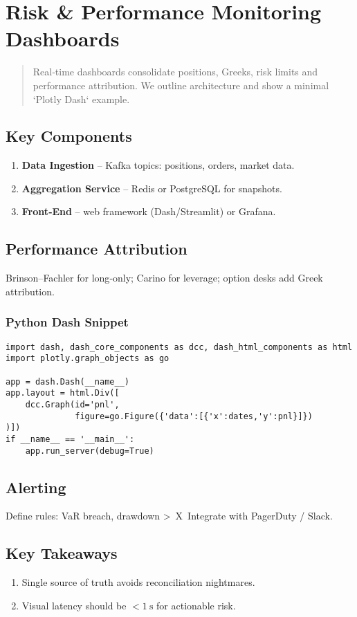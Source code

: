 \chapter{Risk \& Performance Monitoring Dashboards}\label{ch:dashboards}

\begin{abstract}
Real‑time dashboards consolidate positions, Greeks, risk limits and
performance attribution.  We outline architecture and show a minimal
`Plotly Dash` example.
\end{abstract}

\section{Key Components}

\begin{enumerate}
  \item \textbf{Data Ingestion} – Kafka topics: positions, orders, market data.
  \item \textbf{Aggregation Service} – Redis or PostgreSQL for snapshots.
  \item \textbf{Front‑End} – web framework (Dash/Streamlit) or Grafana.
\end{enumerate}

\section{Performance Attribution}

Brinson–Fachler for long‑only; Carino for leverage; option desks add
Greek attribution.

\subsection*{Python Dash Snippet}

\begin{verbatim}
import dash, dash_core_components as dcc, dash_html_components as html
import plotly.graph_objects as go

app = dash.Dash(__name__)
app.layout = html.Div([
    dcc.Graph(id='pnl',
              figure=go.Figure({'data':[{'x':dates,'y':pnl}]})
)])
if __name__ == '__main__':
    app.run_server(debug=True)
\end{verbatim}

\section{Alerting}

Define rules: VaR breach, drawdown > X %
Integrate with PagerDuty / Slack.

\section*{Key Takeaways}
\begin{enumerate}
  \item Single source of truth avoids reconciliation nightmares.
  \item Visual latency should be \(<\SI{1}{\second}\) for actionable risk.
\end{enumerate}
